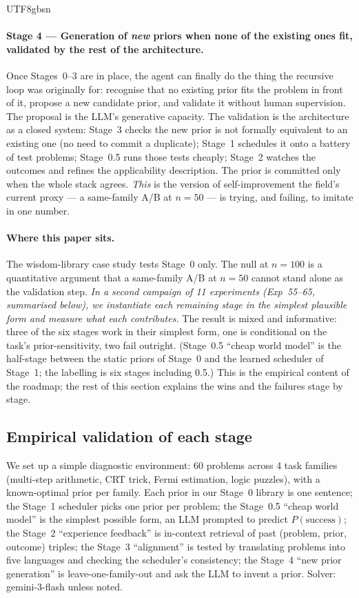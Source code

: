 \documentclass{article}
\begin{document}
\begin{CJK*}{UTF8}{gbsn}
\paragraph{Stage 4 --- Generation of \emph{new} priors when none
of the existing ones fit, validated by the rest of the
architecture.} Once Stages~\(0\)--\(3\) are in place, the agent
can finally do the thing the recursive loop was originally for:
recognise that no existing prior fits the problem in front of
it, propose a new candidate prior, and validate it without
human supervision. The proposal is the LLM's generative
capacity. The validation is the architecture as a closed
system: Stage~3 checks the new prior is not formally equivalent
to an existing one (no need to commit a duplicate); Stage~1
schedules it onto a battery of test problems; Stage~0.5 runs
those tests cheaply; Stage~2 watches the outcomes and refines
the applicability description. The prior is committed only when
the whole stack agrees. \emph{This} is the version of
self-improvement the field's current proxy --- a same-family A/B
at \(n=50\) --- is trying, and failing, to imitate in one number.

\paragraph{Where this paper sits.}
The wisdom-library case study tests Stage~0 only. The null at
\(n=100\) is a quantitative argument that a same-family A/B at
\(n=50\) cannot stand alone as the validation step. \emph{In a
second campaign of 11 experiments (Exp~55--65, summarised below),
we instantiate each remaining stage in the simplest plausible
form and measure what each contributes.} The result is mixed and
informative: three of the six stages work in their simplest form,
one is conditional on the task's prior-sensitivity, two fail
outright. (Stage~0.5 ``cheap world model'' is the half-stage
between the static priors of Stage~0 and the learned scheduler
of Stage~1; the labelling is six stages including 0.5.) This is the empirical content of the
roadmap; the rest of this section explains the wins and the
failures stage by stage.

\subsection{Empirical validation of each stage}
\label{sec:roadmap-validation}

We set up a simple diagnostic environment: 60 problems across 4
task families (multi-step arithmetic, CRT trick, Fermi estimation,
logic puzzles), with a known-optimal prior per family. Each prior
in our Stage~0 library is one sentence; the Stage~1 scheduler
picks one prior per problem; the Stage~0.5 ``cheap world model'' is
the simplest possible form, an LLM prompted to predict
\(P(\text{success})\); the Stage~2 ``experience feedback'' is
in-context retrieval of past (problem, prior, outcome) triples;
the Stage~3 ``alignment'' is tested by translating problems into
five languages and checking the scheduler's consistency; the
Stage~4 ``new prior generation'' is leave-one-family-out and ask
the LLM to invent a prior. Solver: gemini-3-flash unless noted.


\end{CJK*}
\end{document}
